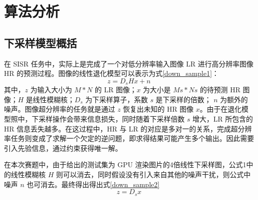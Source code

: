 \documentclass[12pt, a4paper, oneside]{ctexbook}
\begin{document}
	
	\chapter{算法分析}
	\section{下采样模型概括}
	在 SISR 任务中，实际上是完成了一个对低分辨率输入图像 LR 进行高分辨率图像 HR 的预测过程。图像的线性退化模型可以表示为式\ref{down_sample1}：
	\begin{equation}
		z=D_sHx + n \label{down_sample1}
	\end{equation}
	其中，$z$ 为输入大小为 $M*N$ 的 LR 图像；$x$ 为大小是 $Ms*Ns$ 的待预测 HR 图像；$H$ 是线性模糊核；$D_s$ 为下采样算子，系数 $s$ 是下采样的倍数； $n$ 为额外的噪声。图像超分辨率的任务就是通过 $z$ 恢复出未知的 HR 图像 $x$。由于在退化模型照中，下采样操作会带来信息损失，同时随着下采样倍数 $s$ 增大，LR 所包含的 HR 信息丢失越多。在这过程中，HR 与 LR 的对应是多对一的关系，完成超分辨率任务则变成了求解一个欠定的逆问题，即求得结果可能产生多个输出。因此需要引入先验信息，通过约束获得唯一解。\par 在本次赛题中，由于给出的测试集为 GPU 渲染图片的4倍线性下采样图，公式1中的线性模糊核 $H$ 则可以消去，同时假设没有引入来自其他的噪声干扰，则公式中噪声 $n$ 也可消去。最终得出得出式\ref{down_sample2}
	\begin{equation}
		z=D_sx \label{down_sample2}
	\end{equation}
	
\end{document}
